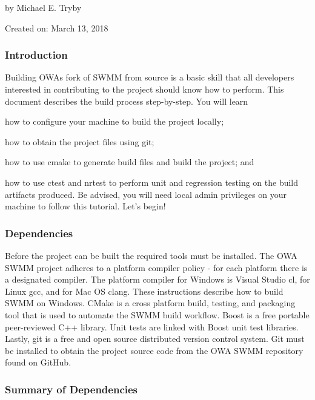 by Michael E. Tryby

Created on\+: March 13, 2018

\subsubsection*{Introduction}

Building O\+WA\textquotesingle{}s fork of S\+W\+MM from source is a basic skill that all developers interested in contributing to the project should know how to perform. This document describes the build process step-\/by-\/step. You will learn


\begin{DoxyEnumerate}
\item how to configure your machine to build the project locally;
\item how to obtain the project files using git;
\item how to use cmake to generate build files and build the project; and
\item how to use ctest and nrtest to perform unit and regression testing on the build artifacts produced. Be advised, you will need local admin privileges on your machine to follow this tutorial. Let’s begin!
\end{DoxyEnumerate}

\subsubsection*{Dependencies}

Before the project can be built the required tools must be installed. The O\+WA S\+W\+MM project adheres to a platform compiler policy -\/ for each platform there is a designated compiler. The platform compiler for Windows is Visual Studio cl, for Linux gcc, and for Mac OS clang. These instructions describe how to build S\+W\+MM on Windows. C\+Make is a cross platform build, testing, and packaging tool that is used to automate the S\+W\+MM build workflow. Boost is a free portable peer-\/reviewed C++ library. Unit tests are linked with Boost unit test libraries. Lastly, git is a free and open source distributed version control system. Git must be installed to obtain the project source code from the O\+WA S\+W\+MM repository found on Git\+Hub.

\subsubsection*{Summary of Dependencies}


